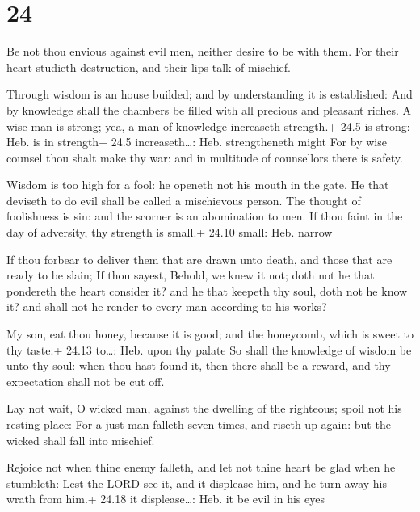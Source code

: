 \hypertarget{section-23}{%
\section{24}\label{section-23}}

 Be not thou envious against evil men, neither desire to be
with them.  For their heart studieth destruction, and their
lips talk of mischief.

 Through wisdom is an house builded; and by understanding it
is established:  And by knowledge shall the chambers be
filled with all precious and pleasant riches.  A wise man is
strong; yea, a man of knowledge increaseth strength.+ 24.5 is strong:
Heb. is in strength+ 24.5 increaseth\ldots: Heb. strengtheneth might
 For by wise counsel thou shalt make thy war: and in
multitude of counsellors there is safety.

 Wisdom is too high for a fool: he openeth not his mouth in
the gate.  He that deviseth to do evil shall be called a
mischievous person.  The thought of foolishness is sin: and
the scorner is an abomination to men.  If thou faint in the
day of adversity, thy strength is small.+ 24.10 small: Heb. narrow

 If thou forbear to deliver them that are drawn unto death,
and those that are ready to be slain;  If thou sayest,
Behold, we knew it not; doth not he that pondereth the heart consider
it? and he that keepeth thy soul, doth not he know it? and shall not he
render to every man according to his works?

 My son, eat thou honey, because it is good; and the
honeycomb, which is sweet to thy taste:+ 24.13 to\ldots: Heb. upon thy
palate  So shall the knowledge of wisdom be unto thy soul:
when thou hast found it, then there shall be a reward, and thy
expectation shall not be cut off.

 Lay not wait, O wicked man, against the dwelling of the
righteous; spoil not his resting place:  For a just man
falleth seven times, and riseth up again: but the wicked shall fall into
mischief.

 Rejoice not when thine enemy falleth, and let not thine
heart be glad when he stumbleth:  Lest the LORD see it, and
it displease him, and he turn away his wrath from him.+ 24.18 it
displease\ldots: Heb. it be evil in his eyes


